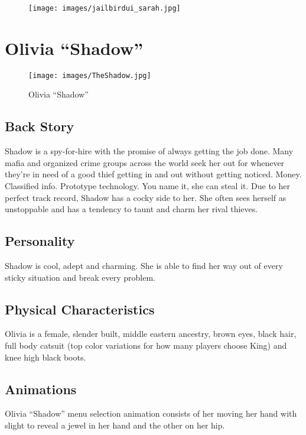 \documentclass[11pt]{report}
\begin{document}
\begin{figure}[H]
    \centering
    \texttt{[image: images/jailbirdui\_sarah.jpg]}
    \caption{}
\end{figure}

\section{Olivia ``Shadow''}

\begin{figure}[H]
    \centering
    \texttt{[image: images/TheShadow.jpg]}
    \caption{Olivia ``Shadow''}
\end{figure}

\subsection{Back Story}

Shadow is a spy-for-hire with the promise of always getting the job done. Many mafia and organized crime groups across the world seek her out for whenever they’re in need of a good thief getting in and out without getting noticed. Money. Classified info. Prototype technology. You name it, she can steal it. Due to her perfect track record, Shadow has a cocky side to her. She often sees herself as unstoppable and has a tendency to taunt and charm her rival thieves.

\subsection{Personality}

Shadow is cool, adept and charming. She is able to find her way out of every sticky situation and break every problem.

\subsection{Physical Characteristics}

Olivia is a female, slender built, middle eastern ancestry, brown eyes, black hair, full body catsuit (top color variations for how many players choose King) and knee high black boots.

\subsection{Animations}

Olivia “Shadow” menu selection animation consists of her moving her hand with slight to reveal a jewel in her hand and the other on her hip.
\end{document}
